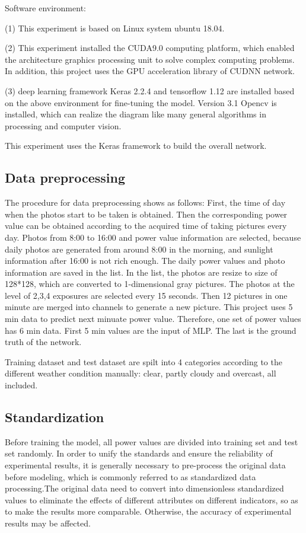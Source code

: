 Software environment:

(1) This experiment is based on Linux system ubuntu 18.04.

(2) This experiment installed the CUDA9.0 computing platform, which enabled the architecture graphics processing unit to solve complex computing problems. In addition, this project uses the GPU acceleration library of CUDNN network.

(3) deep learning framework Keras 2.2.4 and tensorflow 1.12 are installed based on the above environment for fine-tuning the model.   Version 3.1 Opencv is installed, which can realize the diagram like many general algorithms in processing and computer vision. 

This experiment uses the Keras framework to build the overall network.


\subsection{Data preprocessing}

The procedure for data preprocessing shows as follows: First, the time of day when the photos start to be taken is obtained. Then the corresponding power value can be obtained according to the acquired time of taking pictures every day. Photos from 8:00 to 16:00 and power value information are selected, because daily photos are generated from around 8:00 in the morning, and sunlight information after 16:00 is not rich enough.  The daily power values and photo information are saved in the list. In the list, the photos are resize to size of 128*128, which are converted to 1-dimensional gray pictures. The photos at the level of 2,3,4 exposures are selected every 15 seconds. Then 12 pictures in one minute are merged into channels to generate a new picture. This project uses 5 min data to predict next minuate power value. Therefore, one set of power values has 6 min data. First 5 min values are the input of MLP. The last is the ground truth of the network.

Training dataset and test dataset are spilt into 4 categories according to the different weather condition manually: clear, partly cloudy and overcast, all included.


\subsection{Standardization}
Before training the model, all power values are divided into training set and test set randomly. In order to unify the standards and ensure the reliability of experimental results, it is generally necessary to pre-process the original data before modeling, which is commonly referred to as standardized data processing.The original data  need to convert  into dimensionless standardized values to eliminate the effects of different attributes on different indicators, so as to make the results more comparable. Otherwise, the accuracy of experimental results may be affected.

